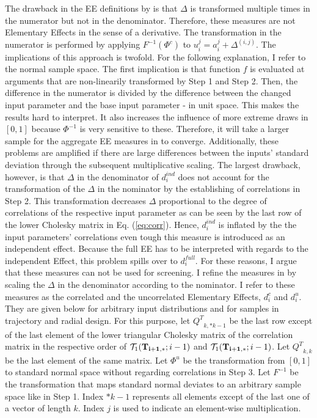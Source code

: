 \documentclass[a4paper,12pt]{article}
\begin{document}
The drawback in the EE definitions by \cite{ge2017extending} is that $\Delta$ is transformed multiple times in the numerator but not in the denominator. Therefore, these measures are not Elementary Effects in the sense of a derivative. The transformation in the numerator is performed by applying $F^{-1}(\Phi^c)$ to $u_i^j = a_i^j + \Delta^{(i,j)}$. The implications of this approach is twofold. For the following explanation, I refer to the normal sample space. The first implication is that function $f$ is evaluated at arguments that are non-linearily transformed by Step 1 and Step 2. Then, the difference in the numerator is divided by the  difference between the changed input parameter and the base input parameter - in unit space. This makes the results hard to interpret. It also increases the influence of more extreme draws in $[0,1]$ because $\Phi^{-1}$ is very sensitive to these. Therefore, it will take a larger sample for the aggregate EE measures in \cite{ge2017extending} to converge. Additionally, these problems are amplified if there are large differences between the inputs' standard deviation through the subsequent multiplicative scaling. The largest drawback, however, is that $\Delta$ in the denominator of $d_i^{ind}$ does not account for the transformation of the $\Delta$ in the nominator by the establishing of correlations in Step 2. This transformation decreases $\Delta$ proportional to the degree of correlations of the respective input parameter as can be seen by the last row of the lower Cholesky matrix in Eq. (\ref{eq:corr}). Hence, $d_i^{ind}$ is inflated by the the input parameters' correlations even tough this measure is introduced as an independent effect. Because the full EE has to be interpreted with regards to the independent Effect, this problem spills over to $d_i^{full}$. For these reasons, I argue that these measures can not be used for screening. I refine the measures in \cite{ge2017extending} by scaling the $\Delta$ in the denominator according to the nominator. I refer to these measures as the correlated and the uncorrelated Elementary Effects, $d_i^{c}$ and $d_i^{u}$. They are given below for arbitrary input distributions and for samples in trajectory and radial design. For this purpose, let ${Q^T}_{k,*k-1}$ be the last row except of the last element of the lower triangular Cholesky matrix of the correlation matrix in the respective order of $\mathcal{T}_1(\bold{T_{i+1,*}}; i-1)$ and $\mathcal{T}_1(\bold{T_{i+1,*}}; i-1)$. Let ${Q^T}_{k,k}$ be the last element of the same matrix. Let $\Phi^u$ be the transformation from $[0,1]$ to standard normal space without regarding correlations in Step 3. Let $F^{-1}$ be the transformation that maps standard normal deviates to an arbitrary sample space like in Step 1. Index $*k-1$ represents all elements except of the last one of a vector of length $k$. Index $j$ is used to indicate an element-wise multiplication.
\end{document}
